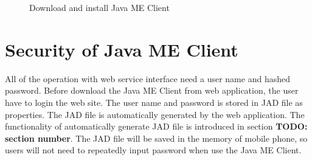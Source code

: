 \begin{figure}[!hbtp]
\centering
{}
\caption{Download and install Java ME Client}
\label{fig:DownloadAndInstallJavaMEClient}
\end{figure}


\section{Security of Java ME Client}
\label{sec:JavaMEClient:SecurityOfJavaMEClient}

All of the operation with web service interface need a user name and hashed password. Before download the Java ME Client from web application, the user have to login the web site. The user name and password is stored in JAD file as properties. The JAD file is automatically generated by the web application. The functionality of automatically generate JAD file is introduced in section \textbf{TODO: section number}. The JAD file will be saved in the memory of mobile phone, so users will not need to repeatedly input password when use the Java ME Client. 

